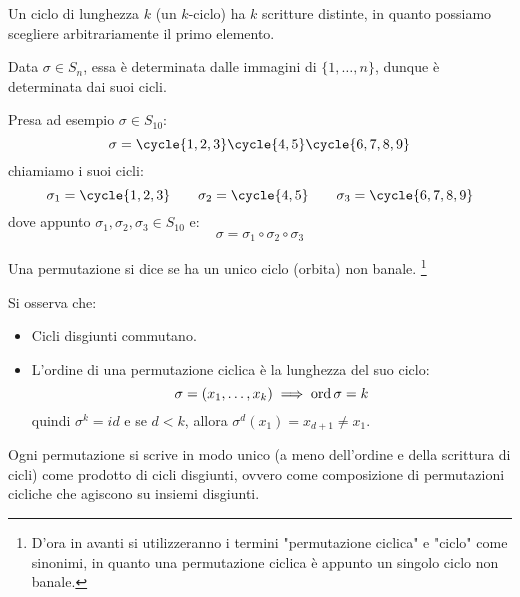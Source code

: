 \documentclass[11pt]{scrartcl}
\begin{document}
\begin{remark}
    Un ciclo di lunghezza $k$ (un $k$-ciclo) ha $k$ scritture distinte, in quanto possiamo scegliere arbitrariamente il primo elemento.
\end{remark}

\begin{remark}
    Data $\sigma \in S_n$, essa è determinata dalle immagini di $\{1,\ldots,n\}$, dunque è determinata dai suoi cicli.
\end{remark}

\begin{example}
    Presa ad esempio $\sigma \in S_{10}$:
        \[ \sigma = \cycle{1,2,3}\cycle{4,5}\cycle{6,7,8,9}
            \]
    chiamiamo i suoi cicli:
        \[ \sigma_1 = \cycle{1,2,3} \qquad \sigma_2 = \cycle{4,5} \qquad \sigma_3 = \cycle{6,7,8,9}
            \]
    dove appunto $\sigma_1,\sigma_2,\sigma_3 \in S_{10}$ e:
        \[ \sigma = \sigma_1 \circ \sigma_2 \circ \sigma_3
            \]
\end{example}

\begin{definition}
    Una permutazione si dice  se ha un unico ciclo (orbita) non banale. 
    \footnote{D'ora in avanti si utilizzeranno i termini "permutazione ciclica" e "ciclo" come sinonimi, in quanto una permutazione ciclica è appunto un singolo ciclo non banale.}
\end{definition}

\begin{remark}
    Si osserva che:
        \begin{itemize}
            \item Cicli disgiunti commutano.
            \item L'ordine di una permutazione ciclica è la lunghezza del suo ciclo:
                    \[ \sigma = (x_1,\ldots,x_k) \implies \operatorname{ord} \sigma = k
                        \]
                quindi $\sigma^k = id$ e se $d < k$, allora $\sigma^d(x_1) = x_{d+1} \ne x_1$.
        \end{itemize}
\end{remark}

\begin{proposition}
    \label{perm}
    Ogni permutazione si scrive in modo unico (a meno dell'ordine e della scrittura di cicli) come prodotto di cicli disgiunti,
     ovvero come composizione di permutazioni cicliche che agiscono su insiemi disgiunti.
\end{proposition}
\end{document}
